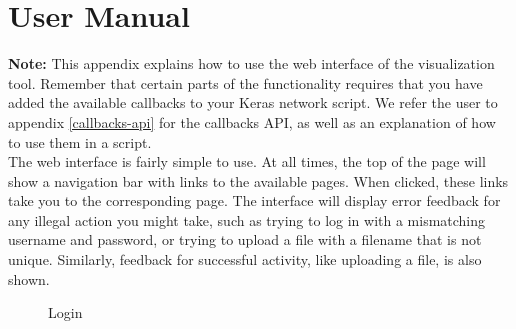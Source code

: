 \chapter{User Manual} \label{user-manual}


\textbf{Note:} This appendix explains how to use the web interface of the visualization tool. Remember that certain parts of the functionality requires that you have added the available callbacks to your Keras network script. We refer the user to appendix \ref{callbacks-api} for the callbacks API, as well as an explanation of how to use them in a script. \\

\noindent The web interface is fairly simple to use. At all times, the top of the page will show a navigation bar with links to the available pages. When clicked, these links take you to the corresponding page. The interface will display error feedback for any illegal action you might take, such as trying to log in with a mismatching username and password, or trying to upload a file with a filename that is not unique. Similarly, feedback for successful activity, like uploading a file, is also shown. \\


\begin{figure}[h!]
    \centering
        \caption{Login}
        \label{login}
\end{figure}


